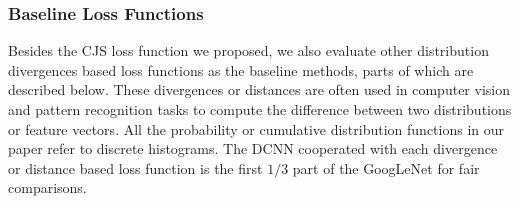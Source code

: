 \documentclass[letterpaper]{article} %
\begin{document}
\subsubsection{Baseline Loss Functions}
\label{sec:baseline}
Besides the CJS loss function we proposed, we also evaluate other distribution divergences based loss functions as the baseline methods, parts of which are described below. These divergences or distances are often used in computer vision and pattern recognition tasks to compute the difference between two distributions or feature vectors.  All the probability or cumulative distribution functions in our paper refer to discrete histograms. The DCNN cooperated with each divergence or distance based loss function is the first $1/3$ part of the GoogLeNet  for fair comparisons.
\end{document}
